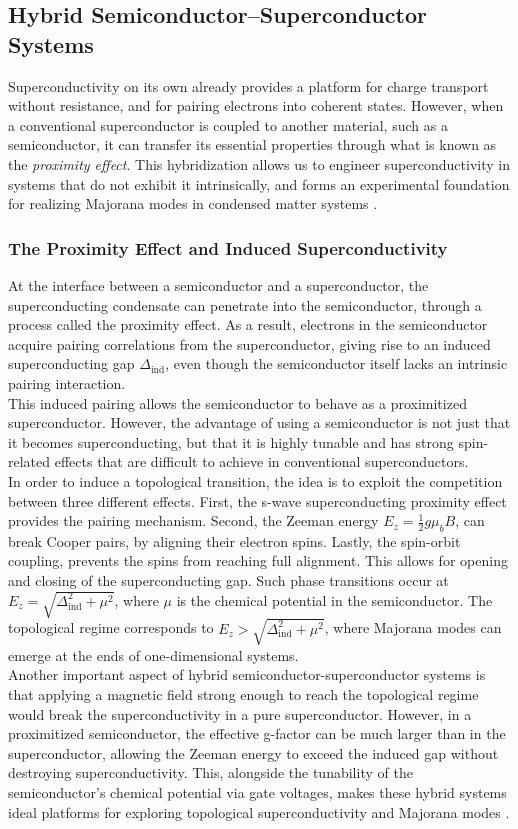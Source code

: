 \documentclass[11pt, letterpaper, titlepage]{article}
\begin{document}
\subsection{Hybrid Semiconductor–Superconductor Systems}
Superconductivity on its own already provides a platform for charge transport without resistance, and for pairing electrons into coherent states. However, when a conventional superconductor is coupled to another material, such as a semiconductor, it can transfer its essential properties through what is known as the \textit{proximity effect}. This hybridization allows us to engineer superconductivity in systems that do not exhibit it intrinsically, and forms an experimental foundation for realizing Majorana modes in condensed matter systems  \cite{Qtech}.
\subsubsection{The Proximity Effect and Induced Superconductivity}
At the interface between a semiconductor and a superconductor, the superconducting condensate can penetrate into the semiconductor, through a process called the proximity effect. As a result, electrons in the semiconductor acquire pairing correlations from the superconductor, giving rise to an induced superconducting gap $Δ_{\mathrm{ind}}$, even though the semiconductor itself lacks an intrinsic pairing interaction.\\
This induced pairing allows the semiconductor to behave as a proximitized superconductor. However, the advantage of using a semiconductor is not just that it becomes superconducting, but that it is highly tunable and has strong spin-related effects that are difficult to achieve in conventional superconductors.\\
In order to induce a topological transition, the idea is to exploit the competition between three different effects. First, the s-wave superconducting proximity effect provides the pairing mechanism. Second, the Zeeman energy $E_z = \frac{1}{2} g μ_bB$, can break Cooper pairs, by aligning their electron spins. Lastly, the spin-orbit coupling, prevents the spins from reaching full alignment. This allows for opening and closing of the superconducting gap. Such phase transitions occur at $E_z = \sqrt{Δ_{\mathrm{ind}}^2 + μ^2}$, where $μ$ is the chemical potential in the semiconductor. The topological regime corresponds to $E_z > \sqrt{Δ_{\mathrm{ind}}^2 + μ^2}$, where Majorana modes can emerge at the ends of one-dimensional systems.\\
Another important aspect of hybrid semiconductor-superconductor systems is that applying a magnetic field strong enough to reach the topological regime would break the superconductivity in a pure superconductor. However, in a proximitized semiconductor, the effective g-factor can be much larger than in the superconductor, allowing the Zeeman energy to exceed the induced gap without destroying superconductivity. This, alongside the tunability of the semiconductor's chemical potential via gate voltages, makes these hybrid systems ideal platforms for exploring topological superconductivity and Majorana modes \cite{Qtech}.\\
\end{document}
